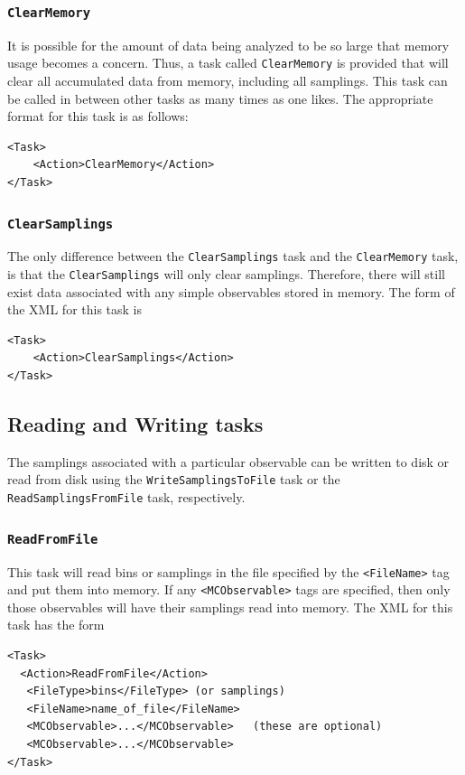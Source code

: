 \documentclass[12pt]{article}
\newcommand{\vb}{\texttt}
\begin{document}
\subsubsection{\vb{ClearMemory}}

It is possible
for the amount of data being analyzed to be so large that memory usage
becomes a concern. Thus, a task called \vb{ClearMemory} is
provided that will clear all accumulated data from memory, including
all samplings. This task can be called
in between other tasks as many times as one likes.
The appropriate format for
this task is as follows:
\begin{verbatim}
<Task>
    <Action>ClearMemory</Action>
</Task>
\end{verbatim}

\subsubsection{\vb{ClearSamplings}}
The only difference between the \vb{ClearSamplings} task and
the \vb{ClearMemory} task, is that the \vb{ClearSamplings} will
only clear samplings. Therefore, there will still exist data
associated with any simple observables stored in memory.
The form of the XML for this task is
\begin{verbatim}
<Task>
    <Action>ClearSamplings</Action>
</Task>
\end{verbatim}

\subsection{Reading and Writing tasks}

The samplings associated with a particular observable can be
written to disk or read from disk using the
\vb{WriteSamplingsToFile} task or the \vb{ReadSamplingsFromFile} task, respectively.

\subsubsection{\vb{ReadFromFile}}
This task will read bins or samplings in the file specified by the \vb{<FileName>} tag and
put them into memory.
If any \vb{<MCObservable>} tags are specified, then only those observables
will have their samplings read into memory.
The XML for this task has the form
\begin{verbatim}
<Task>
  <Action>ReadFromFile</Action>
   <FileType>bins</FileType> (or samplings)
   <FileName>name_of_file</FileName>
   <MCObservable>...</MCObservable>   (these are optional)
   <MCObservable>...</MCObservable>
</Task>
\end{verbatim}
\end{document}
